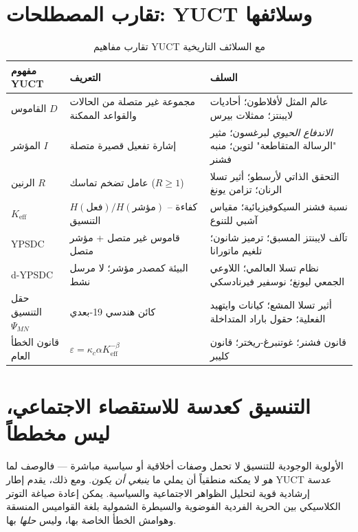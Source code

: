 \documentclass[12pt,a4paper]{article}
\begin{document}
	\section{تقارب المصطلحات: YUCT وسلائفها}
	
	\begin{table}[htbp]
		\centering
		\caption{تقارب مفاهيم YUCT مع السلائف التاريخية}
		\label{tab:convergence}
		\small
		\begin{tabular}{p{2.5cm}p{4.5cm}p{4.5cm}}
			\toprule
			\textbf{مفهوم YUCT} & \textbf{التعريف} & \textbf{السلف} \\
			\midrule
			القاموس \(D\) & مجموعة غير متصلة من الحالات والقواعد الممكنة & عالم المثل لأفلاطون؛ أحاديات لايبنتز؛ ممثلات بيرس \\
			المؤشر \(I\) & إشارة تفعيل قصيرة متصلة & \emph{الاندفاع الحيوي} لبرغسون؛ مثير "الرسالة المتقاطعة" لتوين؛ منبه فشنر \\
			الرنين \(R\) & عامل تضخم تماسك (\(R \ge 1\)) & التحقق الذاتي لأرسطو؛ أثير تسلا الرنان؛ تزامن يونغ \\
			\(K_{\mathrm{eff}}\) & \(H(\text{فعل})/H(\text{مؤشر})\) – كفاءة التنسيق & نسبة فشنر السيكوفيزيائية؛ مقياس آشبي للتنوع \\
			YPSDC & قاموس غير متصل + مؤشر متصل & تآلف لايبنتز المسبق؛ ترميز شانون؛ تلغيم ماتورانا \\
			d-YPSDC & البيئة كمصدر مؤشر؛ لا مرسل نشط & نظام تسلا العالمي؛ اللاوعي الجمعي ليونغ؛ نوسفير فيرنادسكي \\
			حقل التنسيق \(\Psi_{MN}\) & كائن هندسي 19-بعدي & أثير تسلا المشع؛ كيانات وايتهيد الفعلية؛ حقول باراد المتداخلة \\
			قانون الخطأ العام & \(\varepsilon = \kappa_c \alpha K_{\mathrm{eff}}^{-\beta}\) & قانون فشنر؛ غوتنبرغ-ريختر؛ قانون كليبر \\
			\bottomrule
		\end{tabular}
	\end{table}
	
	\section{التنسيق كعدسة للاستقصاء الاجتماعي، ليس مخططاً}
	\label{sec:social-lens}
	
	الأولوية الوجودية للتنسيق لا تحمل وصفات أخلاقية أو سياسية مباشرة — فالوصف لما \emph{هو} لا يمكنه منطقياً أن يملي ما \emph{ينبغي أن يكون}. ومع ذلك، يقدم إطار YUCT عدسة إرشادية قوية لتحليل الظواهر الاجتماعية والسياسية. يمكن إعادة صياغة التوتر الكلاسيكي بين الحرية الفردية الفوضوية والسيطرة الشمولية بلغة القواميس المنسقة وهوامش الخطأ الخاصة بها، وليس \emph{حلها} بها.
	
\end{document}

